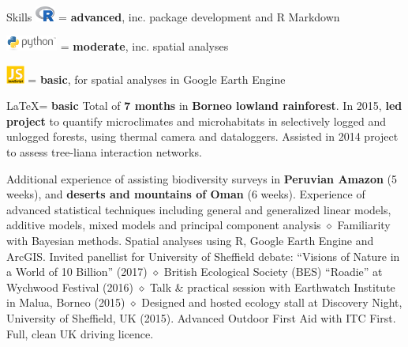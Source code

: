 
\begin{rubric}{Skills}
    \includegraphics[height=0.5cm]{Rlogo.png} = \textbf {advanced}, inc. package development and R Markdown
    \par \includegraphics[height=0.5cm]{python-logo.png} = \textbf{moderate}, inc. spatial analyses
    \par \includegraphics[height=0.6cm]{javascript-logo.jpg} = \textbf{basic}, for spatial analyses in Google Earth Engine
    \par \LaTeX = \textbf{basic}
\entry*[Fieldwork]
    Total of \textbf{7 months} in \textbf{Borneo lowland rainforest}. In 2015, \textbf{led project} to quantify microclimates and microhabitats in selectively logged and unlogged forests, using thermal camera and dataloggers. Assisted in 2014 project to assess tree-liana interaction networks.
    \par \hfill
    \par Additional experience of assisting biodiversity surveys in \textbf{Peruvian Amazon} (5 weeks), and \textbf{deserts and mountains of Oman} (6 weeks).
	Experience of advanced statistical techniques including general and generalized linear models, additive models, mixed models and principal component analysis $\diamond$ Familiarity with Bayesian methods.
\entry*[GIS]
	Spatial analyses using R, Google Earth Engine and ArcGIS.
	Invited panellist for University of Sheffield debate: ``Visions of Nature in a World of 10 Billion'' (2017) $\diamond$ British Ecological Society (BES) ``Roadie'' at Wychwood Festival (2016) $\diamond$ Talk \& practical session with Earthwatch Institute in Malua, Borneo (2015) $\diamond$ Designed and hosted ecology stall at Discovery Night, University of Sheffield, UK (2015).
	Advanced Outdoor First Aid with ITC First.
\entry*[Driving]
	Full, clean UK driving licence.
\end{rubric}
